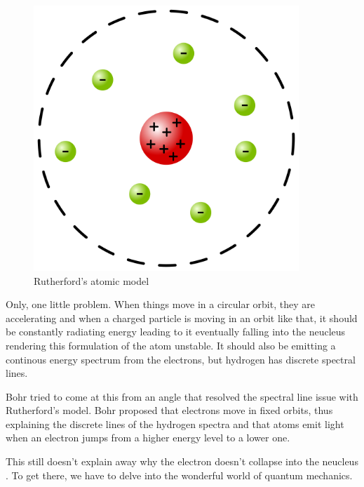 \begin{figure}[H]
  \centering
  \includegraphics[width=100mm]{figures/rutherford.png}
  \caption{Rutherford's atomic model}
  \label{rutherford}
\end{figure}

Only, one little problem.
When things move in a circular orbit, they are accelerating and when a charged particle is moving in an orbit like that,  it should be constantly radiating energy leading to it eventually falling into the neucleus rendering this formulation of the atom unstable.
It should also be emitting a continous energy spectrum from the electrons, but hydrogen has discrete spectral lines.

Bohr tried to come at this from an angle that resolved the spectral line issue with Rutherford's model.
Bohr proposed that electrons move in fixed orbits, thus explaining the discrete lines of the hydrogen spectra and that atoms emit light when an electron jumps from a higher energy level to a lower one.

This still doesn't explain away why the electron doesn't collapse into the neucleus .
To get there, we have to delve into the wonderful world of quantum mechanics.
